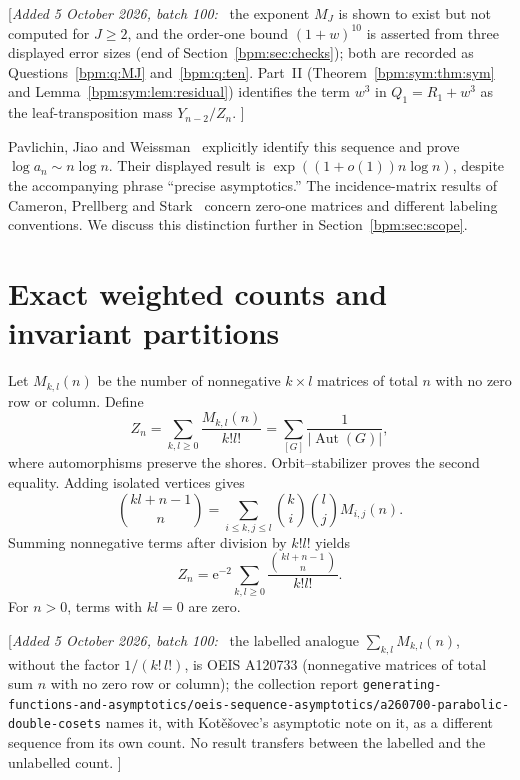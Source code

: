 \documentclass[11pt,a4paper]{article}
\theoremstyle{remark}\newtheorem{remark}[theorem]{Remark}%
\newcommand{\Aut}{\operatorname{Aut}}\newcommand{\ee}{\mathrm e}
\newenvironment{writenote}{\par\smallskip\noindent\small[\textit{Added 5 October 2026, batch 100:}\ }{]\par\smallskip}
\begin{document}
\begin{writenote}
the exponent $M_J$ is shown to exist but not computed for $J\ge2$, and the
order-one bound $(1+w)^{10}$ is asserted from three displayed error sizes
(end of Section~\ref{bpm:sec:checks}); both are recorded as
Questions~\ref{bpm:q:MJ} and~\ref{bpm:q:ten}. Part~II
(Theorem~\ref{bpm:sym:thm:sym} and Lemma~\ref{bpm:sym:lem:residual})
identifies the term $w^3$ in $Q_1=R_1+w^3$ as the leaf-transposition mass
$Y_{n-2}/Z_n$.
\end{writenote}

Pavlichin, Jiao and Weissman~\cite[Theorem 12 and Appendix C]{PML} explicitly identify this sequence and prove $\log a_n\sim n\log n$. Their displayed result is $\exp((1+o(1))n\log n)$, despite the accompanying phrase ``precise asymptotics.'' The incidence-matrix results of Cameron, Prellberg and Stark~\cite{CPS,CPS2} concern zero-one matrices and different labeling conventions. We discuss this distinction further in Section~\ref{bpm:sec:scope}.

\section{Exact weighted counts and invariant partitions}
Let $M_{k,l}(n)$ be the number of nonnegative $k\times l$ matrices of total $n$ with no zero row or column. Define
\begin{equation}\label{bpm:eq:Z}
 Z_n=\sum_{k,l\ge0}\frac{M_{k,l}(n)}{k!l!}
     =\sum_{[G]}\frac1{|\Aut(G)|},
\end{equation}
where automorphisms preserve the shores. Orbit--stabilizer proves the second equality. Adding isolated vertices gives
\[
 \binom{kl+n-1}{n}=\sum_{i\le k,j\le l}\binom ki\binom lj M_{i,j}(n).
\]
Summing nonnegative terms after division by $k!l!$ yields
\begin{equation}\label{bpm:eq:mass}
 Z_n=\ee^{-2}\sum_{k,l\ge0}\frac{\binom{kl+n-1}{n}}{k!l!}.
\end{equation}
For $n>0$, terms with $kl=0$ are zero.

\begin{writenote}
the labelled analogue $\sum_{k,l}M_{k,l}(n)$, without the factor
$1/(k!\,l!)$, is OEIS A120733 (nonnegative matrices of total sum $n$ with no
zero row or column); the collection report
\nolinkurl{generating-functions-and-asymptotics/oeis-sequence-asymptotics/a260700-parabolic-double-cosets}
names it, with Kotěšovec's asymptotic note on it, as a different sequence
from its own count. No result transfers between the labelled and the
unlabelled count.
\end{writenote}
\end{document}
